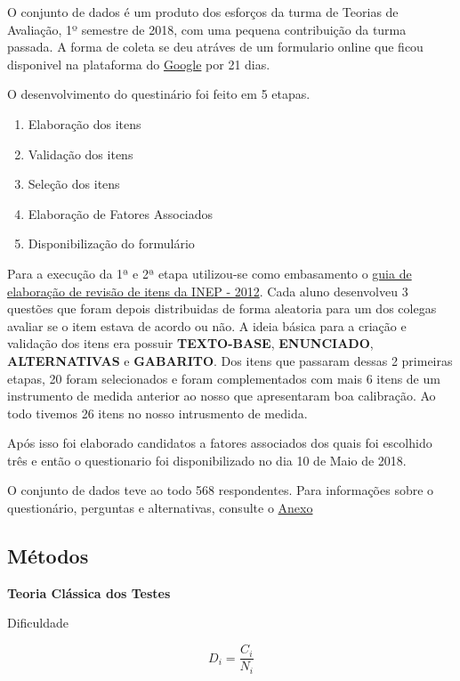 \documentclass[]{article}
\providecommand{\tightlist}{%
  \setlength{\itemsep}{0pt}\setlength{\parskip}{0pt}}
\begin{document}
O conjunto de dados é um produto dos esforços da turma de Teorias de
Avaliação, 1º semestre de 2018, com uma pequena contribuição da turma
passada. A forma de coleta se deu atráves de um formulario online que
ficou disponivel na plataforma do
\href{https://www.google.com/forms/about/}{Google} por 21 dias.

O desenvolvimento do questinário foi feito em 5 etapas.

\begin{enumerate}
\def\labelenumi{\arabic{enumi}.}
\tightlist
\item
  Elaboração dos itens
\item
  Validação dos itens
\item
  Seleção dos itens
\item
  Elaboração de Fatores Associados
\item
  Disponibilização do formulário
\end{enumerate}

Para a execução da 1ª e 2ª etapa utilizou-se como embasamento o
\href{www.ufpr.br/~aanjos/CE095/guia_elaboracao_revisao_itens_2012_INEP.pdf}{guia
de elaboração de revisão de itens da INEP - 2012}. Cada aluno
desenvolveu 3 questões que foram depois distribuidas de forma aleatoria
para um dos colegas avaliar se o item estava de acordo ou não. A ideia
básica para a criação e validação dos itens era possuir
\textbf{TEXTO-BASE}, \textbf{ENUNCIADO}, \textbf{ALTERNATIVAS} e
\textbf{GABARITO}. Dos itens que passaram dessas 2 primeiras etapas, 20
foram selecionados e foram complementados com mais 6 itens de um
instrumento de medida anterior ao nosso que apresentaram boa calibração.
Ao todo tivemos 26 itens no nosso intrusmento de medida.

Após isso foi elaborado candidatos a fatores associados dos quais foi
escolhido três e então o questionario foi disponibilizado no dia 10 de
Maio de 2018.

O conjunto de dados teve ao todo 568 respondentes. Para informações
sobre o questionário, perguntas e alternativas, consulte o
\protect\hyperlink{Anexo}{Anexo}

\hypertarget{metodos}{\subsection{Métodos}\label{metodos}}

\textbf{Teoria Clássica dos Testes}

Dificuldade

\[D_i = \frac{C_i}{N_i}\]
\end{document}
